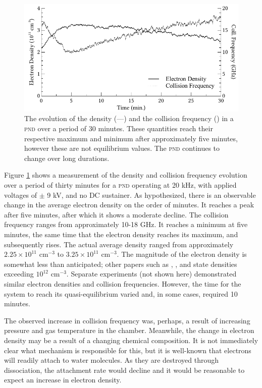         \begin{figure}
            \centering
            \includegraphics{./figures/densev.pdf}
            \caption{The evolution of the density (---) and the collision frequency (\raisebox{2.5pt}{${\scriptscriptstyle \centerdot \centerdot \centerdot}$}) in a \textsc{pnd} over a period of 30 minutes. These quantities reach their respective maximum and minimum after approximately five minutes, however these are not equilibrium values. The \textsc{pnd} continues to change over long durations.}\label{fig:densev}
        \end{figure}
        Figure \ref{fig:densev} shows a measurement of the density and collision frequency evolution over a period of thirty minutes for a \textsc{pnd} operating at 20 kHz, with applied voltages of $\pm$ 9 kV, and no DC sustainer. As hypothesized, there is an observable change in the average electron density on the order of minutes. It reaches a peak after five minutes, after which it shows a moderate decline. The collision frequency ranges from approximately 10-18 GHz. It reaches a minimum at five minutes, the same time that the electron density reaches its maximum, and subsequently rises. The actual average density ranged from approximately $2.25\times 10^{11}$ cm$^{-3}$ to $3.25\times 10^{11}$ cm$^{-3}$. The magnitude of the electron density is somewhat less than anticipated; other papers such as \cite{Aleksandrov2007}, \cite{Pancheshnyi1999}, and \cite{Macheret2006} state densities exceeding $10^{12}$ cm$^{-3}$. Separate experiments (not shown here) demonstrated similar electron densities and collision frequencies. However, the time for the system to reach its quasi-equilibrium varied and, in some cases, required 10 minutes.
        
        The observed increase in collision frequency was, perhaps, a result of increasing pressure and gas temperature in the chamber. Meanwhile, the change in electron density may be a result of a changing chemical composition. It is not immediately clear what mechanism is responsible for this, but it is well-known that electrons will readily attach to water molecules. As they are destroyed through dissociation, the attachment rate would decline and it would be reasonable to expect an increase in electron density.

